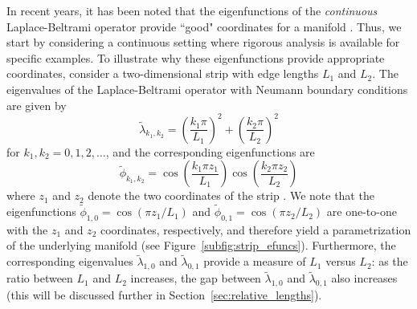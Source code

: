 In recent years, it has been noted that the eigenfunctions of the \emph{continuous} Laplace-Beltrami operator provide ``good" coordinates for a manifold \cite{jones2008}.
%
Thus, we start by considering a continuous setting where rigorous analysis is available for specific examples.
%
%
To illustrate why these eigenfunctions provide appropriate coordinates, consider a two-dimensional strip with edge lengths $L_1$ and $L_2$.
%
The eigenvalues of the Laplace-Beltrami operator with Neumann boundary conditions are given by
\begin{equation} \label{eq:evals}
\tilde{\lambda}_{k_1, k_2} = \left( \frac{k_1 \pi}{L_1} \right)^2 + \left( \frac{k_2 \pi}{L_2} \right)^2
\end{equation}
for $k_1, k_2 = 0, 1, 2, \dots$,
and the corresponding eigenfunctions are
\begin{equation} \label{eq:efuncs}
\tilde{\phi}_{k_1, k_2} = \cos \left( \frac{k_1 \pi z_1}{L_1} \right) \cos \left( \frac{k_2 \pi z_2}{L_2} \right)
\end{equation}
where $z_1$ and $z_2$ denote the two coordinates of the strip \cite{singer2008non}.
%
We note that the eigenfunctions $\tilde{\phi}_{1, 0} = \cos \left( {\pi z_1}/{L_1} \right)$ and $\tilde{\phi}_{0, 1} = \cos \left( {\pi z_2}/{L_2} \right)$ are one-to-one with the $z_1$ and $z_2$ coordinates, respectively, and therefore yield a parametrization of the underlying manifold (see Figure~\ref{subfig:strip_efuncs}).
%
Furthermore, the corresponding eigenvalues $\tilde{\lambda}_{1,0}$ and $\tilde{\lambda}_{0,1}$ provide a measure of $L_1$ versus $L_2$: as the ratio between $L_1$ and $L_2$ increases, the gap between $\tilde{\lambda}_{1,0}$ and $\tilde{\lambda}_{0,1}$ also increases (this will be discussed further in Section~\ref{sec:relative_lengths}).
%


